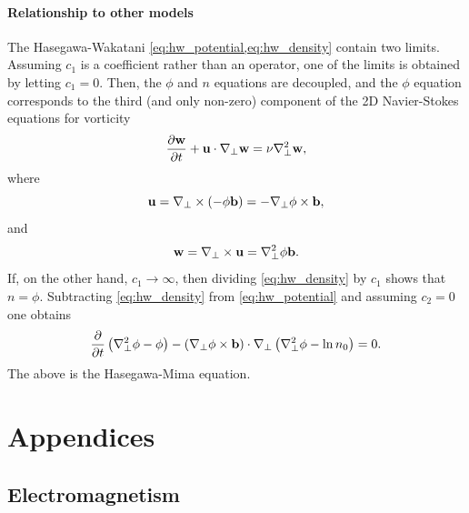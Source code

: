 \documentclass[oneside,a4paper,11pt]{report}
\begin{document}
\subsection{Relationship to other models}
The Hasegawa-Wakatani \cref{eq:hw_potential,eq:hw_density} contain two limits. Assuming $c_1$ is a coefficient rather than an operator, one of the limits is obtained by letting $c_1 = 0$. Then, the $\phi$ and $n$ equations are decoupled, and the $\phi$ equation corresponds to the third (and only non-zero) component of the 2D Navier-Stokes equations for vorticity
\begin{equation}
    \frac{\partial \mathbf{w}}{\partial t} + \mathbf{u} \cdot \nabla_\perp \mathbf{w} = \nu \nabla^2_\perp \mathbf{w},
\end{equation}
where
\begin{equation}
    \mathbf{u} = \nabla_\perp \times (-\phi \mathbf{b}) = - \nabla_\perp \phi \times \mathbf{b},
\end{equation}
and
\begin{equation}
    \mathbf{w} = \nabla_\perp \times \mathbf{u} = \nabla^2_\perp \phi \mathbf{b}.
\end{equation}
If, on the other hand, $c_1 \to \infty$, then dividing \cref{eq:hw_density} by $c_1$ shows that $n = \phi$. Subtracting \cref{eq:hw_density} from \cref{eq:hw_potential} and assuming $c_2=0$ one obtains 
\begin{equation}
    \frac{\partial}{\partial t} \left ( \nabla^2_\perp \phi - \phi \right ) - \left (\nabla_\perp \phi \times \mathbf{b} \right ) \cdot \nabla_\perp \left ( \nabla^2_\perp \phi - \ln n_0 \right ) = 0.
\end{equation}
The above is the Hasegawa-Mima equation.
%
%
\part{Appendices}
%
%
\appendix

\chapter{Electromagnetism}

\end{document}
